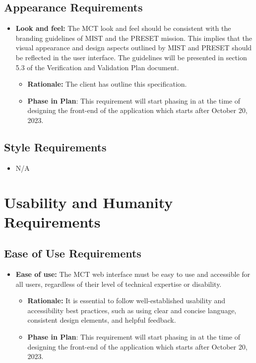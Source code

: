 \documentclass[12pt]{article}
\begin{document}
\subsection{Appearance Requirements}

\begin{itemize}
    \item \textbf{Look and feel:} The MCT look and feel should be consistent with the branding guidelines of MIST and the PRESET mission. This implies that the visual appearance and design aspects outlined by MIST and PRESET should be reflected in the user interface. The guidelines will be presented in section 5.3 of the Verification and Validation Plan document.
    \begin{itemize}
        \item \textbf{Rationale: }The client has outline this specification.
        \item \textbf{Phase in Plan}: This requirement will start phasing in at the time of designing the front-end of the application which starts after October 20, 2023.
    \end{itemize}
\end{itemize}


\subsection{Style Requirements}
\begin{itemize}
    \item N/A
\end{itemize}

\section{Usability and Humanity Requirements}
\subsection{Ease of Use Requirements}

\begin{itemize}
    \item \textbf{Ease of use:} The MCT web interface must be easy to use and accessible for all users, regardless of their level of technical expertise or disability.
    \begin{itemize}
        \item 
\textbf{Rationale: }It is essential to follow well-established usability and accessibility best practices, such as using clear and concise language, consistent design elements, and helpful feedback. 
\item \textbf{Phase in Plan}: This requirement will start phasing in at the time of designing the front-end of the application which starts after October 20, 2023.


    \end{itemize}
\end{itemize}
\end{document}
